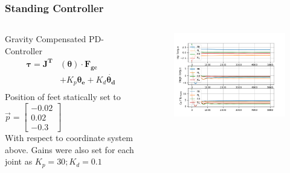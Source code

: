 \documentclass{beamer}
\begin{document}
\begin{frame}
    \frametitle{Standing Controller}
    \begin{columns}[onlytextwidth, T]
        \begin{column}{.4\textwidth}
            Gravity Compensated PD-Controller
            \begin{align*}
                \bm{\tau} = \bm{J^T}&(\bm{\theta})\cdot \bm{F_{gc}} \\
                & + K_p \bm{\theta_e} + K_d \bm{\dot{\theta_d}} \\ 
            \end{align*}
            Position of feet statically set to 
            $ \vec{p} = \begin{bmatrix}
                -0.02 \\
                0.02 \\
                -0.3
              \end{bmatrix}$ \\
              With respect to coordinate system above. Gains were also set
              for each joint as $ K_p = 30; K_d = 0.1$
        \end{column}
        \begin{column}{.7\textwidth}
            \begin{figure}
                \includegraphics[height=0.4\textheight]{../images/torques.png}
            \end{figure}
            \vspace{-0.9cm}
            \begin{figure}

\end{figure}
\end{column}
\end{columns}
\end{frame}
\end{document}

